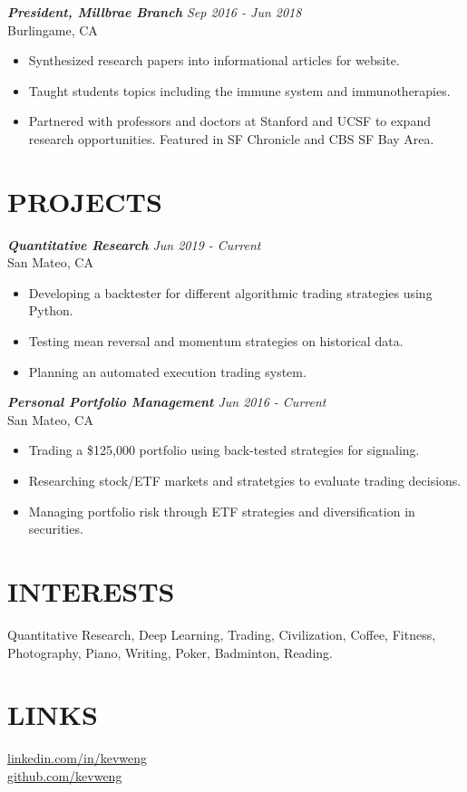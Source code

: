 \documentclass[margin, 10pt]{res} %
\begin{document}
\begin{resume}
{\sl {\bf President, Millbrae Branch} \hfill Sep 2016 - Jun 2018} \\
Burlingame, CA
\begin{itemize}  \itemsep -1pt
\item Synthesized research papers into informational articles for website. 
\item Taught students topics including the immune system and immunotherapies.
\item Partnered with professors and doctors at Stanford and UCSF to expand research opportunities. Featured in SF Chronicle and CBS SF Bay Area.
\end{itemize} 




\section{\large PROJECTS} 

{\sl {\bf Quantitative Research} \hfill Jun 2019 - Current} \\
San Mateo, CA
\begin{itemize}  \itemsep -1pt
\item Developing a backtester for different algorithmic trading strategies using Python.
\item Testing mean reversal and momentum strategies on historical data.
\item Planning an automated execution trading system. 
\end{itemize} 

{\sl {\bf Personal Portfolio Management} \hfill Jun 2016 - Current} \\
San Mateo, CA
\begin{itemize}  \itemsep -1pt
\item Trading a \$125,000 portfolio using back-tested strategies for signaling.
\item Researching stock/ETF markets and stratetgies to evaluate trading decisions.
\item Managing portfolio risk through ETF strategies and diversification in securities.
\end{itemize} 
\section{\large INTERESTS}
Quantitative Research, Deep Learning, Trading, Civilization, Coffee, Fitness, Photography, Piano, Writing, Poker, Badminton, Reading.

\section{\large LINKS}

\href{https://www.linkedin.com/in/kevweng/}{linkedin.com/in/kevweng}\\
\href{https://github.com/kevweng}{github.com/kevweng}

\end{resume}
\end{document}
